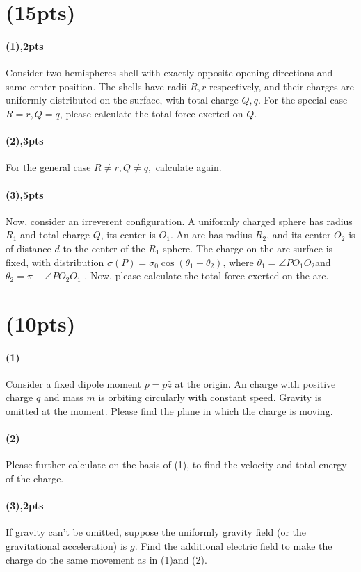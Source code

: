 \documentclass{article}
\begin{document}
\section{(15pts)}
\paragraph{(1),2pts} Consider two hemispheres shell with exactly opposite opening directions and same center position. The shells have radii $R,r$ respectively, and their charges are uniformly distributed on the surface, with total charge $Q,q$. For the special case $R=r,Q=q$, please calculate the total force exerted on $Q$.
\paragraph{(2),3pts} For the general case $R\not=r,Q\not=q,$ calculate again.
\paragraph{(3),5pts} Now, consider an irreverent configuration. A uniformly charged sphere has radius $R_1$ and total charge $Q$, its center is $O_1$. An arc has radius $R_2$, and its center $O_2$ is of distance $d$ to the center of the $R_1$ sphere. The charge on the arc surface is fixed, with distribution $\sigma(P)=\sigma_0 \cos(\theta_1-\theta_2)$, where $\theta_1=\angle PO_1 O_2$and $\theta_2=\pi -\angle P O_2 O_1$ . Now, please calculate the total force exerted on the arc.
\section{(10pts)}
\paragraph{(1)}Consider a fixed dipole moment $p=p\hat{z}$ at the origin. An charge with positive charge $q$ and mass $m$ is orbiting circularly with constant speed. Gravity is omitted at the moment. Please find the plane in which the charge is moving.
\paragraph{(2)} Please further calculate on the basis of (1), to find the velocity and total energy of the charge.
\paragraph{(3),2pts} If gravity can't be omitted, suppose the uniformly gravity field (or the gravitational acceleration) is $g$. Find the additional electric field to make the charge do the same movement as in (1)and (2).
\end{document}
